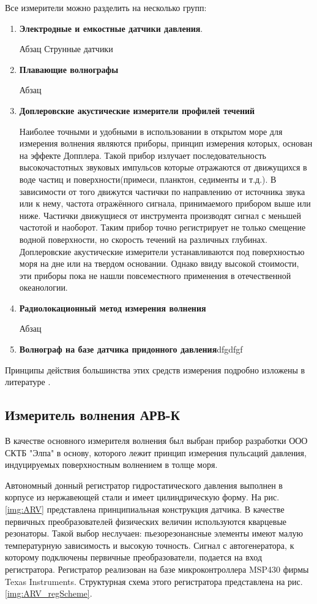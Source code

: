 Все измерители можно разделить на несколько групп:
\begin{enumerate}

  \item \textbf{Электродные и емкостные датчики давления}.

      Абзац Струнные датчики
  \item \textbf{Плавающие волнографы}

        Абзац
  \item \textbf{Доплеровские акустические измерители профилей течений}

      Наиболее точными и удобными в использовании в открытом море для измерения волнения являются приборы, принцип измерения которых, основан на  эффекте Допплера. Такой прибор излучает последовательность высокочастотных звуковых импульсов которые отражаются от движущихся в воде частиц и поверхности(примеси, планктон, седименты и т.д.). В зависимости от того движутся частички по направлению от источника звука или к нему, частота отражённого сигнала, принимаемого прибором выше или ниже. Частички движущиеся от инструмента производят сигнал с меньшей частотой и наоборот. Таким прибор точно регистрирует не только смещение водной поверхности, но скорость течений на различных глубинах. Доплеровские акустические измерители устанавливаются под поверхностью моря на дне или на твердом основании. Однако ввиду высокой стоимости, эти приборы пока не нашли повсеместного применения в отечественной океанологии.
  \item \textbf{Радиолокационный метод измерения волнения}

      Абзац
  \item \textbf{Волнограф на базе датчика придонного давления}dfgdfgf
\end{enumerate}


Принципы действия большинства этих средств измерения подробно изложены в литературе \cite{kovalev1993}.

\subsection{Измеритель волнения АРВ-К}

В качестве основного измерителя волнения был выбран прибор разработки ООО СКТБ "Элпа" в основу, которого лежит принцип измерения пульсаций давления, индуцируемых поверхностным волнением в толще моря.

Автономный донный регистратор гидростатического давления выполнен в корпусе из нержавеющей стали и имеет цилиндрическую форму. На рис. \ref{img:ARV} представлена принципиальная конструкция датчика. В качестве первичных преобразователей физических величин используются кварцевые резонаторы. Такой выбор неслучаен: пьезорезонансные элементы имеют малую температурную зависимость и высокую точность. Сигнал с автогенератора, к которому подключены первичные преобразователи, подается на вход регистратора. Регистратор реализован на базе микроконтроллера MSP430 фирмы Texas Instruments. Структурная схема этого регистратора представлена на рис. \ref{img:ARV_regScheme}.

